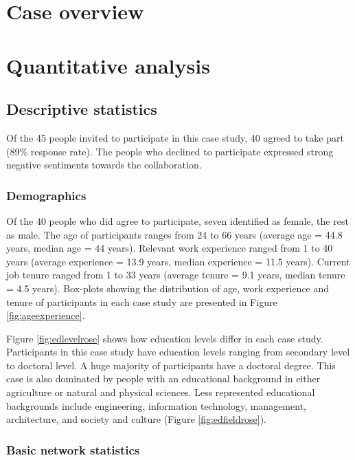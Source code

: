 
\section{Case overview}



\section{Quantitative analysis}

\subsection{Descriptive statistics}

Of the 45 people invited to participate in this case study, 40 agreed to take part (89\% response rate). The people who declined to participate expressed strong negative sentiments towards the collaboration.

\subsubsection{Demographics}

Of the 40 people who did agree to participate, seven identified as female, the rest as male. The age of participants ranges from 24 to 66 years (average age = 44.8 years, median age = 44 years). Relevant work experience ranged from 1 to 40 years (average experience = 13.9 years, median experience = 11.5 years). Current job tenure ranged from 1 to 33 years (average tenure = 9.1 years, median tenure = 4.5 years). Box-plots showing the distribution of age, work experience and tenure of participants in each case study are presented in Figure \ref{fig:ageexperience}.\medskip

Figure \ref{fig:edlevelrose} shows how education levels differ in each case study. Participants in this case study have education levels ranging from secondary level to doctoral level. A huge majority of participants have a doctoral degree. This case is also dominated by people with an educational background in either agriculture or natural and physical sciences. Less represented educational backgrounds include engineering, information technology, management, architecture, and society and culture (Figure \ref{fig:edfieldrose}).

\subsubsection{Basic network statistics}

